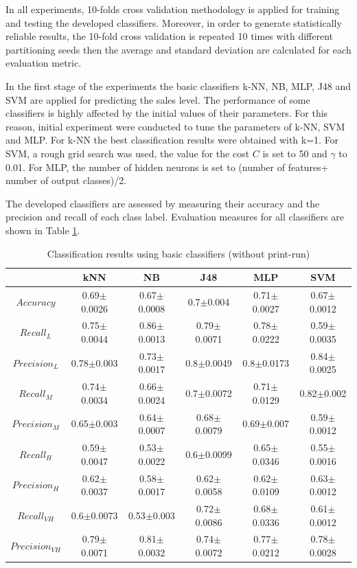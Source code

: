 \documentclass[a4paper,10pt,onecolumn,preprint,3p]{elsarticle}
\begin{document}
In all experiments, 10-folds cross validation methodology is applied for training and testing the developed classifiers. Moreover, in order to generate statistically reliable results, the 10-fold cross validation is repeated 10 times with different partitioning seeds then the average and standard deviation are calculated for each evaluation metric.

In the first stage of the experiments the basic classifiers k-NN, NB, MLP, J48 and SVM are applied for predicting the sales level. The performance of some classifiers is highly affected by the initial values of their parameters. For this reason, initial experiment were conducted to tune the parameters of k-NN, SVM and MLP. For k-NN the best classification results were obtained with k=1. For SVM, a rough grid search was used, the value for the cost $C$ is set to 50 and $\gamma$  to 0.01. For MLP, the number of hidden neurons is set to (number of features+ number of output classes)/2.


The developed classifiers are assessed by measuring their accuracy and the precision and recall of each class label. Evaluation measures for all classifiers are shown in Table \ref{table:basic_classifiers}. 

\begin{table}
\caption{Classification results using basic classifiers (without print-run)}
\centering{}%
\begin{tabular}{|c|c|c|c|c|c|}
\hline 
 & kNN  & NB  & J48  & MLP  & SVM\tabularnewline
\hline 
\hline 
$Accuracy$  & 0.69$\pm$0.0026 & 0.67$\pm$0.0008 & 0.7$\pm$0.004 & 0.71$\pm$0.0027 & 0.67$\pm$0.0012\tabularnewline
\hline 
\hline 
$Recall_{L}$  & 0.75$\pm$0.0044 & 0.86$\pm$0.0013 & 0.79$\pm$0.0071 & 0.78$\pm$0.0222 & 0.59$\pm$0.0035\tabularnewline
\hline 
$Precision_{L}$  & 0.78$\pm$0.003 & 0.73$\pm$0.0017 & 0.8$\pm$0.0049 & 0.8$\pm$0.0173 & 0.84$\pm$0.0025\tabularnewline
\hline 
\hline 
$Recall_{M}$  & 0.74$\pm$0.0034 & 0.66$\pm$0.0024 & 0.7$\pm$0.0072 & 0.71$\pm$0.0129 & 0.82$\pm$0.002\tabularnewline
\hline 
$Precision_{M}$  & 0.65$\pm$0.003 & 0.64$\pm$0.0007 & 0.68$\pm$0.0079 & 0.69$\pm$0.007 & 0.59$\pm$0.0012\tabularnewline
\hline 
\hline 
$Recall_{H}$  & 0.59$\pm$0.0047 & 0.53$\pm$0.0022 & 0.6$\pm$0.0099 & 0.65$\pm$0.0346 & 0.55$\pm$0.0016\tabularnewline
\hline 
$Precision_{H}$  & 0.62$\pm$0.0037 & 0.58$\pm$0.0017 & 0.62$\pm$0.0058 & 0.62$\pm$0.0109 & 0.63$\pm$0.0012\tabularnewline
\hline 
\hline 
$Recall_{VH}$  & 0.6$\pm$0.0073 & 0.53$\pm$0.003 & 0.72$\pm$0.0086 & 0.68$\pm$0.0336 & 0.61$\pm$0.0012\tabularnewline
\hline 
$Precision_{VH}$  & 0.79$\pm$0.0071 & 0.81$\pm$0.0032 & 0.74$\pm$0.0072 & 0.77$\pm$0.0212 & 0.78$\pm$0.0028\tabularnewline
\hline 
\end{tabular}
\label{table:basic_classifiers}
\end{table}
\end{document}
